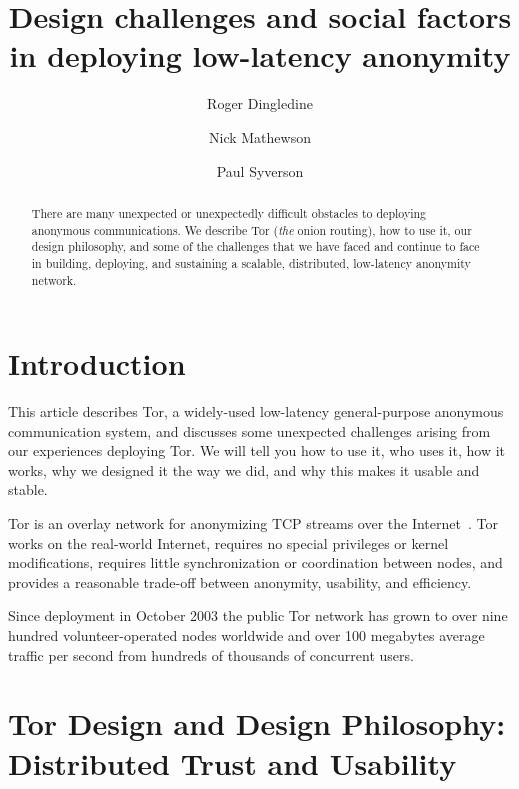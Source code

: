 \documentclass{llncs}
\begin{document}
\title{Design challenges and social factors in deploying low-latency anonymity}

\author{Roger Dingledine \and
Nick Mathewson \and
Paul Syverson}

\maketitle
\pagestyle{plain}

\begin{abstract}
  There are many unexpected or unexpectedly difficult obstacles to
  deploying anonymous communications.  We describe Tor (\emph{the}
  onion routing), how to use it, our design philosophy, and some of
  the challenges that we have faced and continue to face in building,
  deploying, and sustaining a scalable, distributed, low-latency
  anonymity network.
\end{abstract}

\section{Introduction}
This article describes Tor, a widely-used low-latency general-purpose
anonymous communication system, and discusses some unexpected
challenges arising from our experiences deploying Tor.  We will tell
you how to use it, who uses it, how it works, why we designed it the
way we did, and why this makes it usable and stable.

Tor is an overlay network for anonymizing TCP streams over the
Internet~\cite{tor-design}.  Tor works on the real-world Internet,
requires no special privileges or kernel modifications, requires
little synchronization or coordination between nodes, and provides a
reasonable trade-off between anonymity, usability, and efficiency.

Since deployment in October 2003 the public Tor network has grown to
over nine hundred volunteer-operated nodes worldwide and over 100
megabytes average traffic per second from hundreds of thousands of
concurrent users. 

\section{Tor Design and Design Philosophy: Distributed Trust and Usability}
\end{document}
